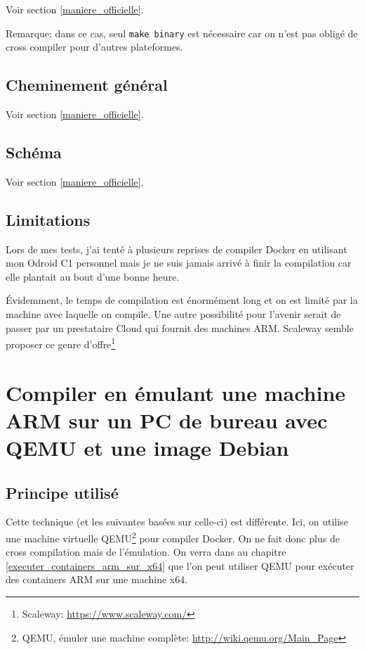 \documentclass[11pt,a4paper,oneside]{report}
\newcommand{\code}[1]{\texttt{#1}} %
\begin{document}
Voir section \ref{maniere_officielle}.

Remarque: dans ce cas, seul \code{make binary} est nécessaire car on n'est pas obligé de cross compiler pour d'autres plateformes.

\subsection{Cheminement général}

Voir section \ref{maniere_officielle}.
\subsection{Schéma}

Voir section \ref{maniere_officielle}.

\subsection{Limitations}

Lors de mes tests, j'ai tenté à plusieurs reprises de compiler Docker en utilisant mon Odroid C1 personnel mais je ne suis jamais arrivé à finir la compilation car elle plantait au bout d'une bonne heure.

Évidemment, le temps de compilation est énormément long et on est limité par la machine avec laquelle on compile. Une autre possibilité pour l'avenir serait de passer par un prestataire Cloud qui fournit des machines ARM. Scaleway semble proposer ce genre d'offre\footnote{Scaleway: \url{https://www.scaleway.com/}}


\section{Compiler en émulant une machine ARM sur un PC de bureau avec QEMU et une image Debian}

\subsection{Principe utilisé}

Cette technique (et les suivantes basées sur celle-ci) est différente. Ici, on utilise une machine virtuelle QEMU\footnote{QEMU, émuler une machine complète: \url{http://wiki.qemu.org/Main_Page}} pour compiler Docker. On ne fait donc plus de cross compilation mais de l'émulation. On verra dans au chapitre \ref{executer_containers_arm_sur_x64} que l'on peut utiliser QEMU pour exécuter des containers ARM sur une machine x64.
\end{document}
